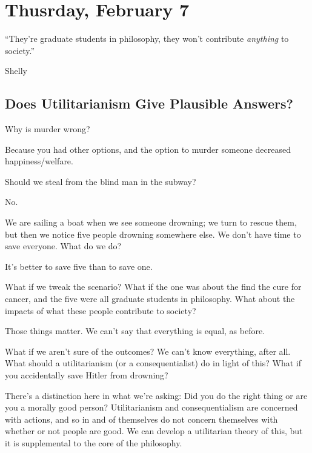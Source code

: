 
\section{Thusrday, February 7}

\epigraph{``They're graduate students in philosophy, they won't contribute \emph{anything} to society.''}{Shelly}

\subsection*{Does Utilitarianism Give Plausible Answers?}

\begin{problem}
Why is murder wrong?

\begin{solution}
Because you had other options, and the option to murder someone decreased happiness/welfare.
\end{solution}
\end{problem}

\begin{problem}
Should we steal from the blind man in the subway?

\begin{solution}
No.
\end{solution}
\end{problem}

\begin{problem}
We are sailing a boat when we see someone drowning; we turn to rescue them, but then we notice five people drowning somewhere else. We don't have time to save everyone. What do we do?

\begin{solution}
It's better to save five than to save one.
\end{solution}

What if we tweak the scenario? What if the one was about the find the cure for cancer, and the five were all graduate students in philosophy. What about the impacts of what these people contribute to society?

\begin{solution}
Those things matter. We can't say that everything is equal, as before.
\end{solution}
\end{problem}

What if we aren't sure of the outcomes? We can't know everything, after all. What should a utilitarianism (or a consequentialist) do in light of this? What if you accidentally save Hitler from drowning?

\begin{example}
There's a distinction here in what we're asking: Did you do the right thing or are you a morally good person? Utilitarianism and consequentialism are concerned with actions, and so in and of themselves do not concern themselves with whether or not people are good. We can develop a utilitarian theory of this, but it is supplemental to the core of the philosophy.
\end{example}